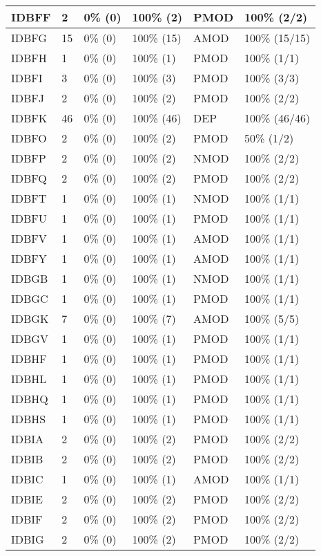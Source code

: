 \begin{figure*}
\begin{tabular}{|l|l|l|l||l|l|}
\hline
 IDBFF & 2 & 0\% (0) & 100\% (2) & PMOD & 100\% (2/2) \\ 
\hline
 IDBFG & 15 & 0\% (0) & 100\% (15) & AMOD & 100\% (15/15) \\ 
\hline
 IDBFH & 1 & 0\% (0) & 100\% (1) & PMOD & 100\% (1/1) \\ 
\hline
 IDBFI & 3 & 0\% (0) & 100\% (3) & PMOD & 100\% (3/3) \\ 
\hline
 IDBFJ & 2 & 0\% (0) & 100\% (2) & PMOD & 100\% (2/2) \\ 
\hline
 IDBFK & 46 & 0\% (0) & 100\% (46) & DEP & 100\% (46/46) \\ 
\hline
 IDBFO & 2 & 0\% (0) & 100\% (2) & PMOD & 50\% (1/2) \\ 
\hline
 IDBFP & 2 & 0\% (0) & 100\% (2) & NMOD & 100\% (2/2) \\ 
\hline
 IDBFQ & 2 & 0\% (0) & 100\% (2) & PMOD & 100\% (2/2) \\ 
\hline
 IDBFT & 1 & 0\% (0) & 100\% (1) & NMOD & 100\% (1/1) \\ 
\hline
 IDBFU & 1 & 0\% (0) & 100\% (1) & PMOD & 100\% (1/1) \\ 
\hline
 IDBFV & 1 & 0\% (0) & 100\% (1) & AMOD & 100\% (1/1) \\ 
\hline
 IDBFY & 1 & 0\% (0) & 100\% (1) & AMOD & 100\% (1/1) \\ 
\hline
 IDBGB & 1 & 0\% (0) & 100\% (1) & NMOD & 100\% (1/1) \\ 
\hline
 IDBGC & 1 & 0\% (0) & 100\% (1) & PMOD & 100\% (1/1) \\ 
\hline
 IDBGK & 7 & 0\% (0) & 100\% (7) & AMOD & 100\% (5/5) \\ 
\hline
 IDBGV & 1 & 0\% (0) & 100\% (1) & PMOD & 100\% (1/1) \\ 
\hline
 IDBHF & 1 & 0\% (0) & 100\% (1) & PMOD & 100\% (1/1) \\ 
\hline
 IDBHL & 1 & 0\% (0) & 100\% (1) & PMOD & 100\% (1/1) \\ 
\hline
 IDBHQ & 1 & 0\% (0) & 100\% (1) & PMOD & 100\% (1/1) \\ 
\hline
 IDBHS & 1 & 0\% (0) & 100\% (1) & PMOD & 100\% (1/1) \\ 
\hline
 IDBIA & 2 & 0\% (0) & 100\% (2) & PMOD & 100\% (2/2) \\ 
\hline
 IDBIB & 2 & 0\% (0) & 100\% (2) & PMOD & 100\% (2/2) \\ 
\hline
 IDBIC & 1 & 0\% (0) & 100\% (1) & AMOD & 100\% (1/1) \\ 
\hline
 IDBIE & 2 & 0\% (0) & 100\% (2) & PMOD & 100\% (2/2) \\ 
\hline
 IDBIF & 2 & 0\% (0) & 100\% (2) & PMOD & 100\% (2/2) \\ 
\hline
 IDBIG & 2 & 0\% (0) & 100\% (2) & PMOD & 100\% (2/2) \\ 
\hline
\end{tabular}
\end{figure*}
